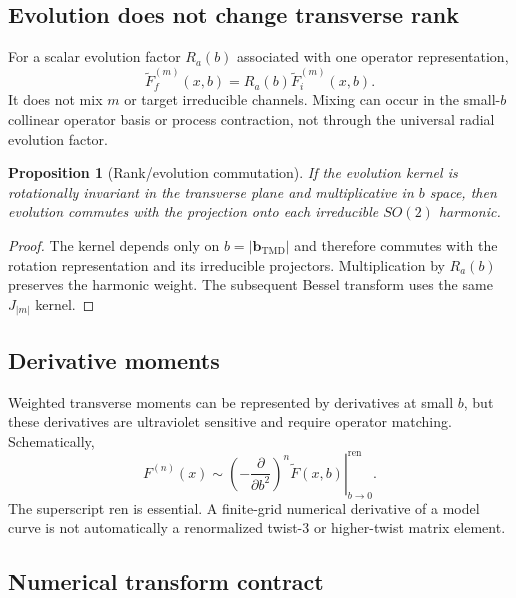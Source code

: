 \documentclass[11pt]{article}
\newtheorem{proposition}[definition]{Proposition}
\newcommand{\bM}{\bm{b}_{\mathrm{TMD}}}
\newcommand{\abs}[1]{\left|#1\right|}
\newcommand{\ren}{\mathrm{ren}}
\begin{document}
\subsection{Evolution does not change transverse rank}

For a scalar evolution factor \(R_a(b)\) associated with one operator
representation,
\begin{equation}
 \widetilde F_f^{(m)}(x,b)
 =R_a(b)\widetilde F_i^{(m)}(x,b).
 \label{eq:rank-preserving-evolution}
\end{equation}
It does not mix \(m\) or target irreducible channels.  Mixing can occur in the
small-\(b\) collinear operator basis or process contraction, not through the
universal radial evolution factor.

\begin{proposition}[Rank/evolution commutation]
If the evolution kernel is rotationally invariant in the transverse plane and
multiplicative in \(b\) space, then evolution commutes with the projection onto
each irreducible \(SO(2)\) harmonic.
\end{proposition}

\begin{proof}
The kernel depends only on \(b=\abs{\bM}\) and therefore commutes with the
rotation representation and its irreducible projectors.  Multiplication by
\(R_a(b)\) preserves the harmonic weight.  The subsequent Bessel transform
uses the same \(J_{|m|}\) kernel.
\end{proof}

\subsection{Derivative moments}

Weighted transverse moments can be represented by derivatives at small
\(b\), but these derivatives are ultraviolet sensitive and require operator
matching.  Schematically,
\begin{equation}
 F^{(n)}(x)
 \sim
 \left.
 \left(-\frac{\partial}{\partial b^2}\right)^n
 \widetilde F(x,b)
 \right|_{b\to0}^{\ren}.
 \label{eq:derivative-moment}
\end{equation}
The superscript \(\ren\) is essential.  A finite-grid numerical derivative of
a model curve is not automatically a renormalized twist-3 or higher-twist
matrix element.

\subsection{Numerical transform contract}
\end{document}
